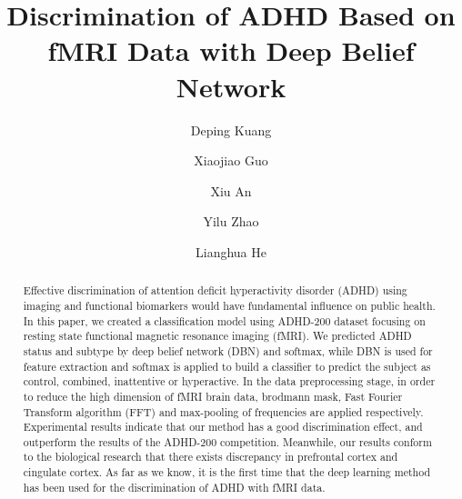 \documentclass{llncs}
\begin{document}
%
\frontmatter          %
%
\pagestyle{headings}  %
%

%
\mainmatter              %
%
\title{Discrimination of ADHD Based on fMRI Data with Deep Belief Network}
%
%
\author{Deping Kuang \and Xiaojiao Guo
 \and Xiu An  \and Yilu Zhao \and Lianghua He}
%
%
%

\maketitle              %

\begin{abstract}
Effective discrimination of attention deficit hyperactivity disorder (ADHD) using imaging and functional biomarkers would have fundamental influence on public health. In this paper, we created a classification model using ADHD-200 dataset focusing on resting state functional magnetic resonance imaging (fMRI). We predicted ADHD status and subtype by deep belief network (DBN) and softmax, while DBN is used for feature extraction and softmax is applied to build a classifier to predict the subject as control, combined, inattentive or hyperactive. In the data preprocessing stage, in order to reduce the high dimension of fMRI brain data, brodmann mask, Fast Fourier Transform algorithm (FFT) and max-pooling of frequencies are applied respectively. Experimental results indicate that our method has a good discrimination effect, and outperform the results of the ADHD-200 competition. Meanwhile, our results conform to the biological research that there exists discrepancy in prefrontal cortex and cingulate cortex. As far as we know, it is the first time that the deep learning method has been used for the discrimination of ADHD with fMRI data.
\end{abstract}
%
\end{document}
